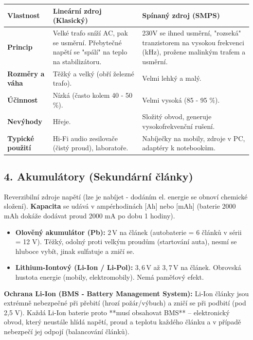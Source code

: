 \documentclass[a4paper,10pt]{article}
\begin{document}
\begin{vysvetlenibox}
\begin{center}
\begin{tabularx}{0.97\linewidth}{@{} l X X @{}}
\toprule
\textbf{Vlastnost} & \textbf{Lineární zdroj (Klasický)} & \textbf{Spínaný zdroj (SMPS)} \\
\midrule
\textbf{Princip} & Velké trafo sníží AC, pak se usměrní. Přebytečné napětí se "spálí" na teplo na stabilizátoru. & 230V se ihned usměrní, "rozseká" tranzistorem na vysokou frekvenci (kHz), prožene malinkým trafem a usměrní. \\
\textbf{Rozměry a váha} & Těžký a velký (obří železné trafo). & Velmi lehký a malý. \\
\textbf{Účinnost} & Nízká (často kolem 40 - 50 \%). & Velmi vysoká (85 - 95 \%). \\
\textbf{Nevýhody} & Hřeje. & Složitý obvod, generuje vysokofrekvenční rušení. \\
\textbf{Typické použití} & Hi-Fi audio zesilovače (čistý proud), laboratoře. & Nabíječky na mobily, zdroje v PC, adaptéry k notebookům. \\
\bottomrule
\end{tabularx}
\end{center}

\subsection*{4. Akumulátory (Sekundární články)}

Reverzibilní zdroje napětí (lze je nabíjet - dodáním el. energie se obnoví chemické složení). \textbf{Kapacita} se udává v ampérhodinách [Ah] nebo [mAh] (baterie 2000 mAh dokáže dodávat proud 2000 mA po dobu 1 hodiny).

\begin{itemize}
    \item \textbf{Olověný akumulátor (Pb):} $2\,\mathrm{V}$ na článek (autobaterie = 6 článků v sérii = 12 V). Těžký, odolný proti velkým proudům (startování auta), nesmí se hluboce vybít, jinak sulfatuje a zničí se.
    \item \textbf{Lithium-Iontový (Li-Ion / Li-Pol):} $3{,}6\,\mathrm{V}$ až $3{,}7\,\mathrm{V}$ na článek. Obrovská hustota energie (mobily, elektromobily). Nemá paměťový efekt. 
\end{itemize}

\begin{durazbox}
\textbf{Ochrana Li-Ion (BMS - Battery Management System):}
Li-Ion články jsou extrémně nebezpečné při přebití (hrozí požár/výbuch) a zničí se při podbití (pod 2,5 V). Každá Li-Ion baterie proto **musí obsahovat BMS** – elektronický obvod, který neustále hlídá napětí, proud a teplotu každého článku a v případě nebezpečí jej odpojí (balancování článků).
\end{durazbox}


\end{vysvetlenibox}
\end{document}
